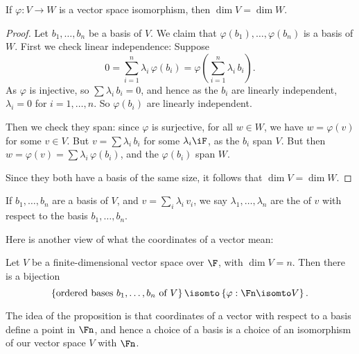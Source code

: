 \begin{lemma}
	If $\varphi:V\to W$ is a vector space isomorphism, then $\dim V=\dim W$. %
\end{lemma}

\begin{proof}
	 Let $b_1,\ldots,b_n$ be a basis of $V$. We claim that $\varphi(b_1),\ldots,\varphi(b_n)$ is a basis of $W$. First we check linear independence: Suppose %
	\begin{equation*}
		0
		= \sum_{i=1}^n \lambda_i \,\varphi(b_i) %
		= \varphi\left( \sum_{i=1}^n \lambda_i \,b_i \right). %
	\end{equation*}
	As $\varphi$ is injective, so $\sum \lambda_i \, b_i = 0$, and hence as the $b_i$ are linearly independent, $\lambda_i=0$ for $i=1,\ldots,n$. So $\varphi(b_i)$ are linearly independent. %
	
	Then we check they span: since $\varphi$ is surjective, for all $w\in W$, we have $w=\varphi(v)$ for some $v\in V$. But $v=\sum \lambda_i\,b_i$ for some $\lambda_i\iF$, as the $b_i$ span $V$. But then $w = \varphi(v) = \sum\lambda_i \,\varphi(b_i)$, and the $\varphi(b_i)$ span $W$. 

Since they both have a basis of the same size, it follows that $\dim V=\dim W$. %
\end{proof}

\begin{definition}
	If $b_1, \dots, b_n$ are a basis of $V$, and $v = \sum_i \lambda_i \, v_i$, we say $\lambda_1, \dots, \lambda_n$ are the  of $v$ with respect to the basis $b_1, \dots, b_n$.  %
\end{definition}

Here is another view of what the coordinates of a vector mean:

\begin{proposition}
	Let $V$ be a finite-dimensional vector space over $\F$, with $\dim V=n$. Then there is a bijection %
	\begin{equation*}
		\left\{\text{ordered bases } b_1,\ldots,b_n \text{ of } V\right\}
		\isomto
		\left\{\varphi:\Fn\isomto V \right\}.
	\end{equation*}
\end{proposition}

The idea of the proposition is that coordinates of a vector with respect to a basis define a point in $\Fn$, and hence a choice of a basis is a choice of an isomorphism of our vector space $V$ with $\Fn$.


